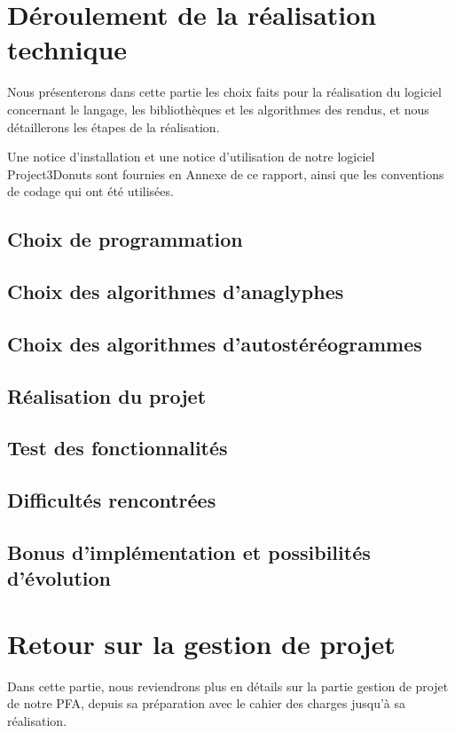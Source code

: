 \documentclass[paper=a4, fontsize=12pt]{article}
\newenvironment{changemargin}[2]{\begin{list}{}{%
      \setlength{\topsep}{0pt}%
      \setlength{\leftmargin}{0pt}%
      \setlength{\rightmargin}{0pt}%
      \setlength{\listparindent}{\parindent}%
      \setlength{\itemindent}{\parindent}%
      \setlength{\parsep}{0pt plus 1pt}%
      \addtolength{\leftmargin}{#1}%
      \addtolength{\rightmargin}{#2}%
    }\item }{\end{list}}
\numberwithin{equation}{section}		%
\numberwithin{figure}{section}			%
\numberwithin{table}{section}				%
\begin{document}
\begin{changemargin}{-1cm}{-1cm}
  \section{Déroulement de la réalisation technique}
  Nous présenterons dans cette partie les choix faits pour la réalisation du logiciel concernant le langage, les bibliothèques et les algorithmes des rendus, et nous détaillerons les étapes de la réalisation.

  Une notice d'installation et une notice d'utilisation de notre logiciel Project3Donuts sont fournies en Annexe de ce rapport, ainsi que les conventions de codage qui ont été utilisées.

  \subsection{Choix de programmation}
  
  \subsection{Choix des algorithmes d'anaglyphes}
  
  \subsection{Choix des algorithmes d'autostéréogrammes}
  
  \subsection{Réalisation du projet}
  
  \subsection{Test des fonctionnalités}
  
  \subsection{Difficultés rencontrées}
  
  \subsection{Bonus d'implémentation et possibilités d'évolution}
  
  
  \newpage

  \section{Retour sur la gestion de projet}
  Dans cette partie, nous reviendrons plus en détails sur la partie gestion de projet de notre PFA, depuis sa préparation avec le cahier des charges jusqu'à sa réalisation.

\end{changemargin}
\end{document}
